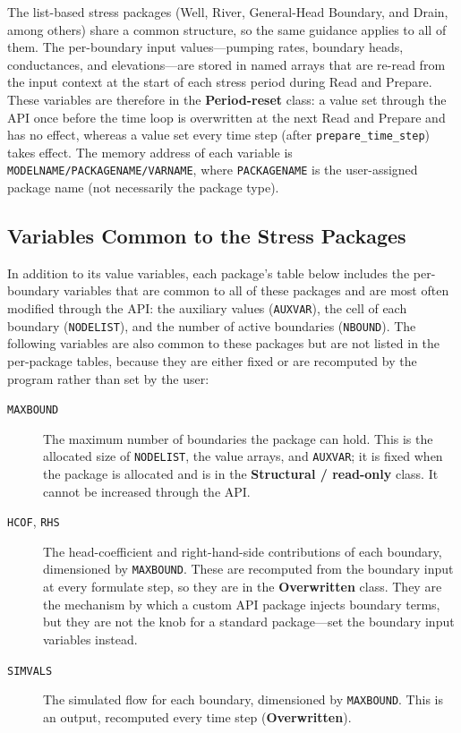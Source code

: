 The list-based stress packages (Well, River, General-Head Boundary, and Drain,
among others) share a common structure, so the same guidance applies to all of
them. The per-boundary input values---pumping rates, boundary heads,
conductances, and elevations---are stored in named arrays that are re-read from
the input context at the start of each stress period during Read and Prepare.
These variables are therefore in the \textbf{Period-reset} class: a value set
through the API once before the time loop is overwritten at the next Read and
Prepare and has no effect, whereas a value set every time step (after
\texttt{prepare\_time\_step}) takes effect. The memory address of each variable
is \texttt{MODELNAME/PACKAGENAME/VARNAME}, where \texttt{PACKAGENAME} is the
user-assigned package name (not necessarily the package type).

\subsection{Variables Common to the Stress Packages}

In addition to its value variables, each package's table below includes the
per-boundary variables that are common to all of these packages and are most
often modified through the API: the auxiliary values (\texttt{AUXVAR}), the cell
of each boundary (\texttt{NODELIST}), and the number of active boundaries
(\texttt{NBOUND}). The following variables are also common to these packages but
are not listed in the per-package tables, because they are either fixed or are
recomputed by the program rather than set by the user:

\begin{description}
\item[\texttt{MAXBOUND}] The maximum number of boundaries the package can hold.
This is the allocated size of \texttt{NODELIST}, the value arrays, and
\texttt{AUXVAR}; it is fixed when the package is allocated and is in the
\textbf{Structural / read-only} class. It cannot be increased through the API.
\item[\texttt{HCOF}, \texttt{RHS}] The head-coefficient and right-hand-side
contributions of each boundary, dimensioned by \texttt{MAXBOUND}. These are
recomputed from the boundary input at every formulate step, so they are in the
\textbf{Overwritten} class. They are the mechanism by which a custom API package
injects boundary terms, but they are not the knob for a standard package---set
the boundary input variables instead.
\item[\texttt{SIMVALS}] The simulated flow for each boundary, dimensioned by
\texttt{MAXBOUND}. This is an output, recomputed every time step
(\textbf{Overwritten}).
\end{description}

